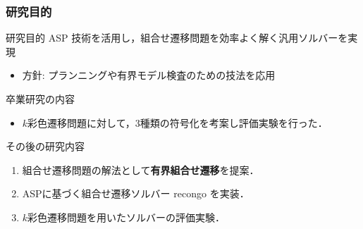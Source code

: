 \documentclass[dvipdfmx,11pt]{beamer}
\begin{document}
\begin{frame}
  \frametitle{研究目的}
  \begin{alertblock}{研究目的}
    ASP 技術を活用し，組合せ遷移問題を効率よく解く汎用ソルバーを実現
  \end{alertblock}
  \begin{itemize}
  \item 方針: プランニングや有界モデル検査のための技法を応用
  \end{itemize}

  \begin{block}{卒業研究の内容}
    \begin{itemize}
      \item $k$彩色遷移問題に対して，3種類の符号化を考案し評価実験を行った．
    \end{itemize}
  \end{block}

  \begin{exampleblock}{その後の研究内容}
    \begin{enumerate}
      \item 組合せ遷移問題の解法として\textbf{有界組合せ遷移}を提案．
      \item \alert<2>{ASPに基づく組合せ遷移ソルバー recongo を実装．}
      \item \alert<2>{$k$彩色遷移問題を用いたソルバーの評価実験．}
    \end{enumerate}
  \end{exampleblock}
\end{frame}
\end{document}

